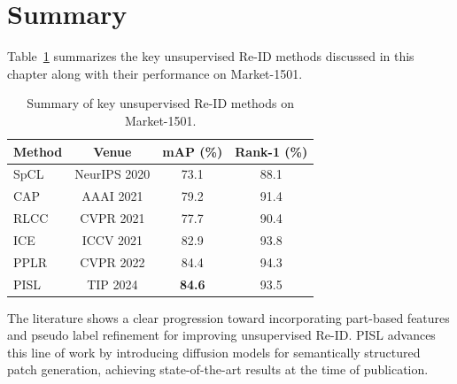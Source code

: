 \section{Summary}

Table~\ref{tab:lit_summary} summarizes the key unsupervised Re-ID methods discussed in this chapter along with their performance on Market-1501.

\begin{table}[H]
    \centering
    \caption{Summary of key unsupervised Re-ID methods on Market-1501.}
    \label{tab:lit_summary}
    \begin{tabular}{l c c c}
        \toprule
        \textbf{Method} & \textbf{Venue} & \textbf{mAP (\%)} & \textbf{Rank-1 (\%)} \\
        \midrule
        SpCL \cite{ge2020selfpaced}        & NeurIPS 2020  & 73.1 & 88.1 \\
        CAP \cite{wang2021cap}             & AAAI 2021     & 79.2 & 91.4 \\
        RLCC \cite{zhang2021rlcc}          & CVPR 2021     & 77.7 & 90.4 \\
        ICE \cite{chen2021ice}             & ICCV 2021     & 82.9 & 93.8 \\
        PPLR \cite{cho2022pplr}            & CVPR 2022     & 84.4 & 94.3 \\
        PISL \cite{tao2024unsupervised}    & TIP 2024      & \textbf{84.6} & 93.5 \\
        \bottomrule
    \end{tabular}
\end{table}

The literature shows a clear progression toward incorporating part-based features and pseudo label refinement for improving unsupervised Re-ID. PISL advances this line of work by introducing diffusion models for semantically structured patch generation, achieving state-of-the-art results at the time of publication.
